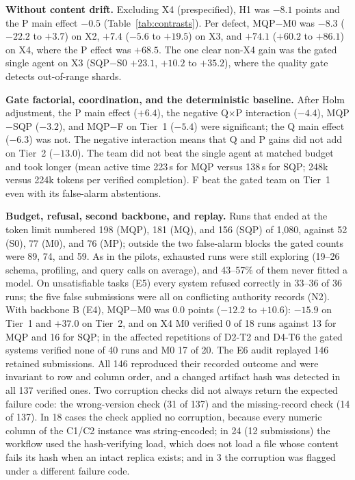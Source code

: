 \documentclass[conference]{IEEEtran}
\newcommand{\sys}[1]{\textsf{#1}}
\begin{document}
\textbf{Without content drift.} Excluding X4 (prespecified), H1 was $-8.1$ points and the P main effect $-0.5$
(Table~\ref{tab:contrasts}). Per defect, \sys{MQP}$-$\sys{M0} was $-8.3$ ($-22.2$ to $+3.7$) on X2, $+7.4$
($-5.6$ to $+19.5$) on X3, and $+74.1$ ($+60.2$ to $+86.1$) on X4, where the P effect was $+68.5$. The one clear
non-X4 gain was the gated single agent on X3 (\sys{SQP}$-$\sys{S0} $+23.1$, $+10.2$ to $+35.2$), where the quality
gate detects out-of-range shards.

\textbf{Gate factorial, coordination, and the deterministic baseline.} After Holm adjustment, the P main effect
($+6.4$), the negative Q$\times$P interaction ($-4.4$), \sys{MQP}$-$\sys{SQP} ($-3.2$), and \sys{MQP}$-$\sys{F} on
Tier~1 ($-5.4$) were significant; the Q main effect ($-6.3$) was not. The negative interaction means that Q and P
gains did not add on Tier~2 ($-13.0$). The team did not beat the single agent at matched budget and took longer
(mean active time 223\,s for \sys{MQP} versus 138\,s for \sys{SQP}; 248k versus 224k tokens per verified completion).
\sys{F} beat the gated team on Tier~1 even with its false-alarm abstentions.

\textbf{Budget, refusal, second backbone, and replay.} Runs that ended at the token limit numbered 198 (\sys{MQP}),
181 (\sys{MQ}), and 156 (\sys{SQP}) of 1,080, against 52 (\sys{S0}), 77 (\sys{M0}), and 76 (\sys{MP}); outside the two
false-alarm blocks the gated counts were 89, 74, and 59. As in the pilots, exhausted runs were still exploring
(19--26 schema, profiling, and query calls on average), and 43--57\% of them never fitted a model. On unsatisfiable
tasks (E5) every system refused correctly in 33--36 of 36 runs; the five false submissions were all on conflicting
authority records (N2). With backbone B (E4), \sys{MQP}$-$\sys{M0} was $0.0$ points ($-12.2$ to $+10.6$): $-15.9$
on Tier~1 and $+37.0$ on Tier~2, and on X4 \sys{M0} verified 0 of 18 runs against 13 for \sys{MQP} and 16 for
\sys{SQP}; in the affected repetitions of D2-T2 and D4-T6 the gated systems verified none of 40 runs and \sys{M0} 17
of 20. The E6 audit replayed 146 retained submissions. All 146 reproduced their recorded outcome and were invariant to
row and column order, and a changed artifact hash was detected in all 137 verified ones. Two corruption checks did not
always return the expected failure code: the wrong-version check (31 of 137) and the missing-record check (14 of 137).
In 18 cases the check applied no corruption, because every numeric column of the C1/C2 instance was string-encoded; in
24 (12 submissions) the workflow used the hash-verifying load, which does not load a file whose content fails its hash
when an intact replica exists; and in 3 the corruption was flagged under a different failure code.
\end{document}
